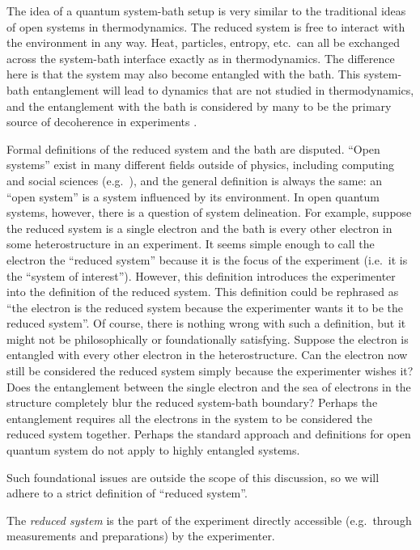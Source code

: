 The idea of a quantum system-bath setup is very similar to the traditional ideas of open systems in thermodynamics.  The reduced system is free to interact with the environment in any way.  Heat, particles, entropy, etc.\ can all be exchanged across the system-bath interface exactly as in thermodynamics.  The difference here is that the system may also become entangled with the bath.  This system-bath entanglement will lead to dynamics that are not studied in thermodynamics, and the entanglement with the bath is considered by many to be the primary source of decoherence in experiments \cite{Zurek2003}.

Formal definitions of the reduced system and the bath are disputed.  ``Open systems'' exist in many different fields outside of physics, including computing and social sciences (e.g.\ \cite{Luhmann1995}), and the general definition is always the same: an ``open system'' is a system influenced by its environment.  In open quantum systems, however, there is a question of system delineation.  For example, suppose the reduced system is a single electron and the bath is every other electron in some heterostructure in an experiment.  It seems simple enough to call the electron the ``reduced system'' because it is the focus of the experiment (i.e.\ it is the ``system of interest'').  However, this definition introduces the experimenter into the definition of the reduced system.  This definition could be rephrased as ``the electron is the reduced system because the experimenter wants it to be the reduced system''.  Of course, there is nothing wrong with such a definition, but it might not be philosophically or foundationally satisfying.  Suppose the electron is entangled with every other electron in the heterostructure.  Can the electron now still be considered the reduced system simply because the experimenter wishes it?  Does the entanglement between the single electron and the sea of electrons in the structure completely blur the reduced system-bath boundary?  Perhaps the entanglement requires all the electrons in the system to be considered the reduced system together.  Perhaps the standard approach and definitions for open quantum system do not apply to highly entangled systems.

Such foundational issues are outside the scope of this discussion, so we will adhere to a strict definition of ``reduced system''.  
\begin{definition}
The {\em reduced system} is the part of the experiment directly accessible (e.g.\ through measurements and preparations) by the experimenter.  
\end{definition}

